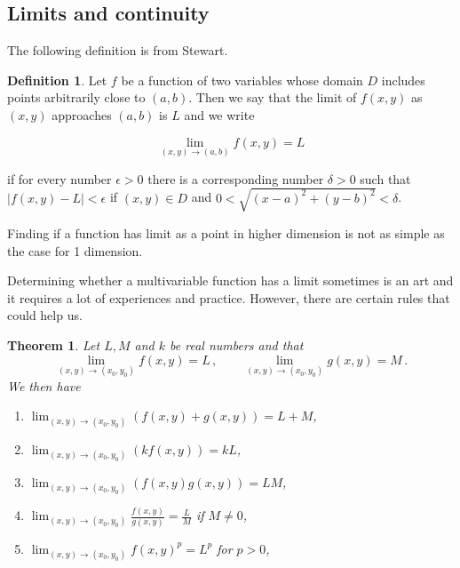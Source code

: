 \documentclass[
]{article}
\newtheorem{theorem}{Theorem}[section]
\theoremstyle{definition}
\newtheorem{definition}{Definition}[section]
\theoremstyle{definition}
\theoremstyle{definition}
\theoremstyle{definition}
\theoremstyle{remark}
\begin{document}
\subsection{Limits and continuity}\label{limits-and-continuity}

The following definition is from Stewart.

\begin{definition}
Let \(f\) be a function of two variables whose domain \(D\) includes points arbitrarily close to \((a,b)\). Then we say that the limit of \(f(x,y)\) as \((x,y)\) approaches \((a,b)\) is \(L\) and we write

\[\lim_{(x,y)\to(a,b)} f(x,y) = L\]

if for every number \(\epsilon > 0\) there is a corresponding number \(\delta > 0\) such that
\(|f(x,y) - L| < \epsilon\)
if \((x,y) \in D\) and \(0 < \sqrt{(x-a)^2 + (y-b)^2} < \delta\).
\end{definition}

Finding if a function has limit as a point in higher dimension is not as simple as
the case for 1 dimension.

Determining whether a multivariable function has a limit sometimes is an art
and it requires a lot of experiences and practice.
However, there are certain rules that could help us.

\begin{theorem}

Let \(L,M\) and \(k\) be real numbers and that
\begin{equation*}
    \lim_{(x,y) \to (x_0,y_0)} f(x,y) = L \,, \qquad 
    \lim_{(x,y) \to (x_0,y_0)} g(x,y) = M \,.
\end{equation*}
We then have

\begin{enumerate}
\def\labelenumi{\arabic{enumi}.}
\item
  \(\displaystyle \lim_{(x,y) \to (x_0,y_0)} (f(x,y) + g(x,y)) = L + M\),
\item
  \(\displaystyle \lim_{(x,y) \to (x_0,y_0)} (k f(x,y)) = kL\),
\item
  \(\displaystyle \lim_{(x,y) \to (x_0,y_0)} (f(x,y) g(x,y)) = LM\),
\item
  \(\displaystyle \lim_{(x,y) \to (x_0,y_0)} \frac{f(x,y)}{g(x,y)} = \frac{L}{M}\) if \(M \not= 0\),
\item
  \(\displaystyle \lim_{(x,y) \to (x_0,y_0)} {f(x,y)^p} = L^p\) for \(p>0\),
\end{enumerate}

\end{theorem}
\end{document}
